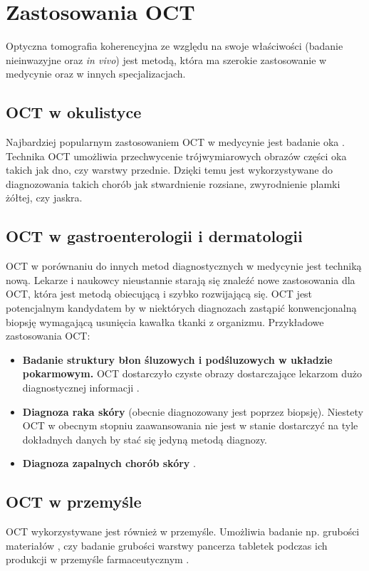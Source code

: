 
\section{Zastosowania OCT}
\label{sec:obrazowanie_oct:zastosowania_oct}

Optyczna tomografia koherencyjna ze względu na swoje właściwości (badanie nieinwazyjne oraz \textit{in vivo}) jest metodą, która ma szerokie zastosowanie w medycynie oraz w innych specjalizacjach.

\subsection{OCT w okulistyce}

Najbardziej popularnym zastosowaniem OCT w medycynie jest badanie oka \cite{Fercher03}. Technika OCT umożliwia przechwycenie trójwymiarowych obrazów części oka takich jak dno, czy warstwy przednie. Dzięki temu jest wykorzystywane do diagnozowania takich chorób jak stwardnienie rozsiane, zwyrodnienie plamki żółtej, czy jaskra.

\subsection{OCT w gastroenterologii i dermatologii}

OCT w porównaniu do innych metod diagnostycznych w medycynie jest techniką nową. Lekarze i naukowcy nieustannie starają się znaleźć nowe zastosowania dla OCT, która jest metodą obiecującą i szybko rozwijającą się. OCT jest potencjalnym kandydatem by w niektórych diagnozach zastąpić konwencjonalną biopsję wymagającą usunięcia kawałka tkanki z organizmu. Przykładowe zastosowania OCT:

\begin{itemize}
\item \textbf{Badanie struktury błon śluzowych i podśluzowych w układzie pokarmowym.} OCT dostarczyło czyste obrazy dostarczające lekarzom dużo diagnostycznej informacji \cite{Rollins:99}.
\item \textbf{Diagnoza raka skóry} (obecnie diagnozowany jest poprzez biopsję). Niestety OCT w obecnym stopniu zaawansowania nie jest w stanie dostarczyć na tyle dokładnych danych by stać się jedyną metodą diagnozy.
\item \textbf{Diagnoza zapalnych chorób skóry} \cite{Welzel01}.
\end{itemize}

\subsection{OCT w przemyśle}

OCT wykorzystywane jest również w przemyśle. Umożliwia badanie np. grubości materiałów \cite{walecki2006determining}, czy badanie grubości warstwy pancerza tabletek podczas ich produkcji w przemyśle farmaceutycznym \cite{markl2014device}.
















